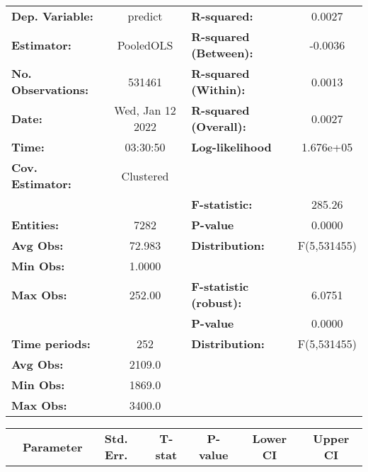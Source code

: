 \begin{center}
\begin{tabular}{lclc}
\toprule
\textbf{Dep. Variable:}    &      predict       & \textbf{  R-squared:         }   &      0.0027      \\
\textbf{Estimator:}        &     PooledOLS      & \textbf{  R-squared (Between):}  &     -0.0036      \\
\textbf{No. Observations:} &       531461       & \textbf{  R-squared (Within):}   &      0.0013      \\
\textbf{Date:}             &  Wed, Jan 12 2022  & \textbf{  R-squared (Overall):}  &      0.0027      \\
\textbf{Time:}             &      03:30:50      & \textbf{  Log-likelihood     }   &    1.676e+05     \\
\textbf{Cov. Estimator:}   &     Clustered      & \textbf{                     }   &                  \\
\textbf{}                  &                    & \textbf{  F-statistic:       }   &      285.26      \\
\textbf{Entities:}         &        7282        & \textbf{  P-value            }   &      0.0000      \\
\textbf{Avg Obs:}          &       72.983       & \textbf{  Distribution:      }   &   F(5,531455)    \\
\textbf{Min Obs:}          &       1.0000       & \textbf{                     }   &                  \\
\textbf{Max Obs:}          &       252.00       & \textbf{  F-statistic (robust):} &      6.0751      \\
\textbf{}                  &                    & \textbf{  P-value            }   &      0.0000      \\
\textbf{Time periods:}     &        252         & \textbf{  Distribution:      }   &   F(5,531455)    \\
\textbf{Avg Obs:}          &       2109.0       & \textbf{                     }   &                  \\
\textbf{Min Obs:}          &       1869.0       & \textbf{                     }   &                  \\
\textbf{Max Obs:}          &       3400.0       & \textbf{                     }   &                  \\
\bottomrule
\end{tabular}
\begin{tabular}{lcccccc}
                & \textbf{Parameter} & \textbf{Std. Err.} & \textbf{T-stat} & \textbf{P-value} & \textbf{Lower CI} & \textbf{Upper CI}  \\

\end{tabular}
\end{center}
